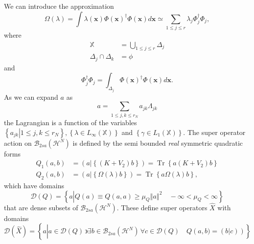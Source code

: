 \documentclass[aps,preprint]{revtex4}%
\begin{document}
We can introduce the approximation
\begin{equation}
\Omega\left(  \lambda\right)  =\int\lambda\left(  \mathbf{x}\right)
\Phi\left(  \mathbf{x}\right)  ^{\dagger}\Phi\left(  \mathbf{x}\right)
d\mathbf{x\simeq}\sum_{1\leq j\leq r}\lambda_{j}\Phi_{j}^{\dagger}\Phi_{j},
\end{equation}
where
\begin{align}
\mathbb{X}  &  =\bigcup\limits_{1\leq j\leq r}\mathbb{\Delta}_{j}\\
\mathbb{\Delta}_{j}\cap\mathbb{\Delta}_{k}  &  =\phi
\end{align}
and
\begin{equation}
\Phi_{j}^{\dagger}\Phi_{j}=\int_{\mathbb{\Delta}_{j}}\Phi\left(
\mathbf{x}\right)  ^{\dagger}\Phi\left(  \mathbf{x}\right)  d\mathbf{x.}%
\end{equation}
As we can expand $a$ as
\begin{equation}
a=\sum_{1\leq j,k\leq r_{N}}a_{jk}\Lambda_{jk}%
\end{equation}
the Lagrangian is a function of the variables $\left\{  \left.  a_{jk}%
\right\vert 1\leq j,k\leq r_{N}\right\}  ,\left\{  \lambda\in L_{\infty
}\left(  \mathbb{X}\right)  \right\}  $ and $\left\{  \gamma\in L_{1}\left(
\mathbb{X}\right)  \right\}  .$ The super operator action on $\mathcal{B}%
_{2sa}\left(  \mathcal{H}^{N}\right)  $ is defined by the semi bounded
\emph{real }symmetric quadratic forms
\begin{align}
Q_{1}\left(  a,b\right)   &  =\left(  a\left\vert \left\{  \left(
K+V_{2}\right)  b\right\}  \right.  \right)  =\operatorname{Tr}\left\{
a\left(  K+V_{2}\right)  b\right\} \nonumber\\
Q_{2}\left(  a,b\right)   &  =\left(  a\left\vert \left\{  \Omega\left(
\lambda\right)  b\right\}  \right.  \right)  =\operatorname{Tr}\left\{
a\Omega\left(  \lambda\right)  b\right\}  ,
\end{align}
which have domains
\begin{equation}
\mathcal{D}\left(  Q\right)  =\left\{  a\left\vert Q\left(  a\right)  \equiv
Q\left(  a,a\right)  \geq\mu_{Q}\left\Vert a\right\Vert ^{2}\right.
\quad-\infty<\mu_{Q}<\infty\right\}
\end{equation}
that are dense subsets of $\mathcal{B}_{2sa}\left(  \mathcal{H}^{N}\right)  .$
These define super operators $\widehat{X}$ with domains
\begin{equation}
\mathcal{D}\left(  \widehat{X}\right)  =\left\{  a\left\vert \overset{}{a\in
\mathcal{D}\left(  Q\right)  \,\backepsilon\exists b\in\mathcal{B}%
_{2sa}\left(  \mathcal{H}^{N}\right)  \,\forall c\in\mathcal{D}\left(
Q\right)  \quad Q\left(  a,b)=\left(  \left.  b\right\vert c\right)  \right)
}\right.  \right\}
\end{equation}
\end{document}
